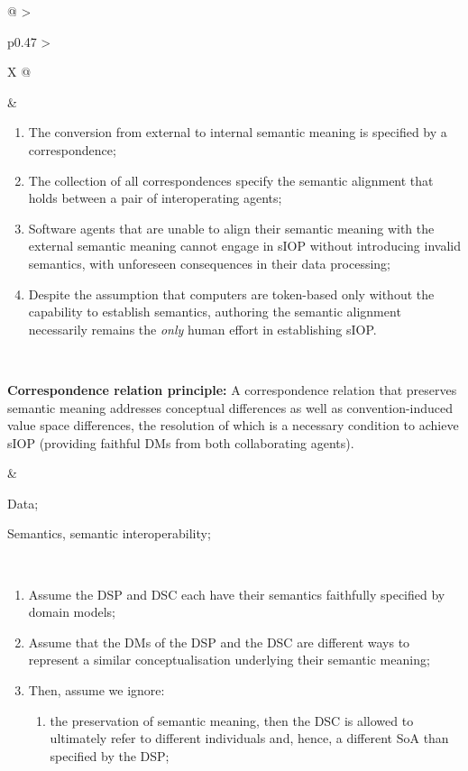 \begin{xltabular}[l]{\linewidth}{@{} >{\small\raggedright\arraybackslash}p{0.47\linewidth} >{\small\raggedright\arraybackslash}X @{}}
\begin{enumerate}[left=6pt, nosep]
\end{enumerate}
&
\begin{enumerate}[left=10pt, nosep]
  \item The conversion from external to internal semantic meaning is specified by a correspondence;
  \item The collection of all correspondences specify the semantic alignment that holds between a pair of interoperating agents;
  \item Software agents that are unable to align their semantic meaning with the external semantic meaning cannot engage in sIOP without introducing invalid semantics, with unforeseen consequences in their data processing;
  \item Despite the assumption that computers are token-based only without the capability to establish semantics, authoring the semantic alignment necessarily remains the \emph{only} human effort in establishing sIOP.
\end{enumerate} \\
%
%
%
\begin{mmdp}\label{dp:alignment-language}{\bfseries Correspondence relation principle:}
\quad A correspondence relation that preserves semantic meaning addresses conceptual differences as well as convention-induced value space differences, the resolution of which is a necessary condition to achieve sIOP (providing faithful DMs from both collaborating agents). \end{mmdp}
&
\begin{description}[labelwidth=3.7cm,leftmargin=3.7cm+1ex,nosep,topsep=2ex,labelsep=1ex,font=\bfseries]
  \item[Type of information:] Data;
  \item[Quality attributes:] Semantics, semantic interoperability;
\end{description}\\
\begin{enumerate}[left=6pt, nosep]
  \item Assume the DSP and DSC each have their semantics faithfully specified by domain models;
  \item Assume that the DMs of the DSP and the DSC are different ways to represent a similar conceptualisation underlying their semantic meaning;
  \item Then, assume we ignore:
  \begin{enumerate}
    \item the preservation of semantic meaning, then the DSC is allowed to ultimately refer to different individuals and, hence, a different SoA than specified by the DSP; 

\end{enumerate}
\end{enumerate}
\end{xltabular}
